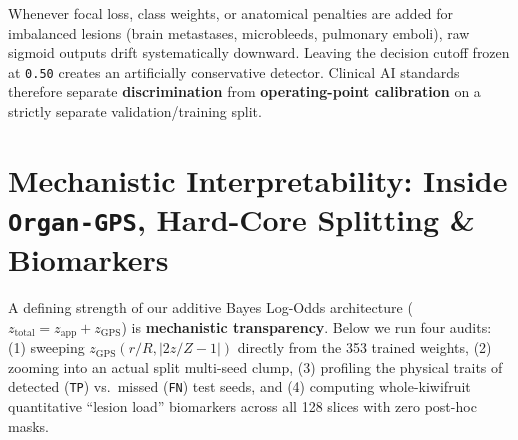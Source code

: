 \documentclass[10pt,a4paper]{article}
\begin{document}
\begin{clinbox}
Whenever focal loss, class weights, or anatomical penalties are added for imbalanced lesions (brain metastases, microbleeds, pulmonary emboli), raw sigmoid outputs drift systematically downward. Leaving the decision cutoff frozen at \texttt{0.50} creates an artificially conservative detector. Clinical AI standards therefore separate \textbf{discrimination} from \textbf{operating-point calibration} on a strictly separate validation/training split.
\end{clinbox}

\section{Mechanistic Interpretability: Inside \texttt{Organ-GPS}, Hard-Core Splitting \& Biomarkers}

A defining strength of our additive Bayes Log-Odds architecture ($z_{\text{total}} = z_{\text{app}} + z_{\text{GPS}}$) is \textbf{mechanistic transparency}. Below we run four audits: (1) sweeping $z_{\text{GPS}}(r/R, |2z/Z - 1|)$ directly from the 353 trained weights, (2) zooming into an actual split multi-seed clump, (3) profiling the physical traits of detected (\texttt{TP}) vs.\ missed (\texttt{FN}) test seeds, and (4) computing whole-kiwifruit quantitative ``lesion load'' biomarkers across all 128 slices with zero post-hoc masks.
\end{document}
